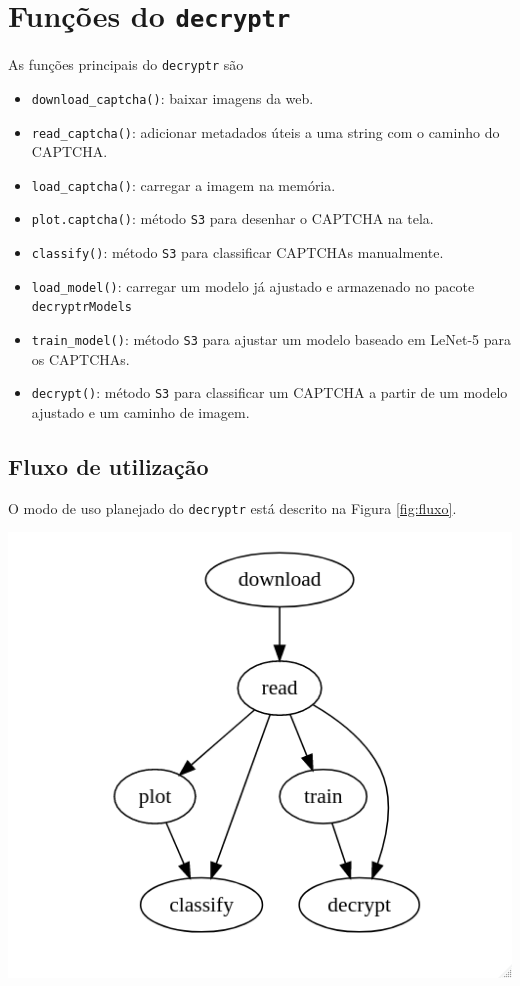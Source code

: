 \documentclass[12pt,]{report}
\providecommand{\tightlist}{%
  \setlength{\itemsep}{0pt}\setlength{\parskip}{0pt}}
\let\origfigure\figure
\let\endorigfigure\endfigure
\renewenvironment{figure}[1][2] {
    \expandafter\origfigure\expandafter[H]
} {
    \endorigfigure
}
\begin{document}
\section{\texorpdfstring{Funções do
\texttt{decryptr}}{Funções do decryptr}}\label{funcoes-do-decryptr}

As funções principais do \texttt{decryptr} são

\begin{itemize}
\tightlist
\item
  \texttt{download\_captcha()}: baixar imagens da web.
\item
  \texttt{read\_captcha()}: adicionar metadados úteis a uma string com o
  caminho do CAPTCHA.
\item
  \texttt{load\_captcha()}: carregar a imagem na memória.
\item
  \texttt{plot.captcha()}: método \texttt{S3} para desenhar o CAPTCHA na
  tela.
\item
  \texttt{classify()}: método \texttt{S3} para classificar CAPTCHAs
  manualmente.
\item
  \texttt{load\_model()}: carregar um modelo já ajustado e armazenado no
  pacote \texttt{decryptrModels}
\item
  \texttt{train\_model()}: método \texttt{S3} para ajustar um modelo
  baseado em LeNet-5 para os CAPTCHAs.
\item
  \texttt{decrypt()}: método \texttt{S3} para classificar um CAPTCHA a
  partir de um modelo ajustado e um caminho de imagem.
\end{itemize}

\subsection{Fluxo de utilização}\label{fluxo-de-utilizacao}

O modo de uso planejado do \texttt{decryptr} está descrito na Figura
\ref{fig:fluxo}.

\begin{figure}

{\centering \includegraphics[width=0.6\linewidth]{imgs/fluxo} 

}

\caption{Fluxo de utilização do pacote `decryptr`.}\label{fig:fluxo}
\end{figure}
\end{document}
